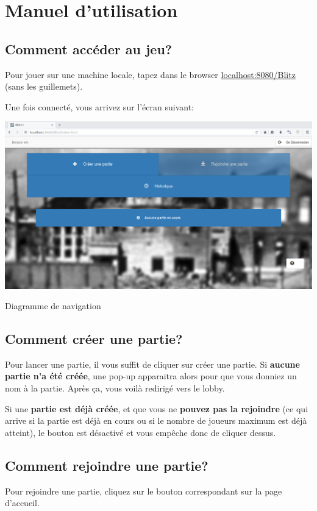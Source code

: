 \documentclass[11pt]{scrreprt}
\begin{document}
    \section{Manuel d'utilisation}
    \subsection{Comment accéder au jeu?}
    Pour jouer sur une machine locale, tapez dans le browser \og \url{localhost:8080/Blitz}\fg{} (sans les guillemets).

    Une fois connecté, vous arrivez sur l'écran suivant:

    \begin{table}[H]
        \centering
        \includegraphics[width=\textwidth]{images/accueil.png}
        \caption{Diagramme de navigation}
    \end{table}

    \subsection{Comment créer une partie?}
    Pour lancer une partie, il vous suffit de cliquer sur créer une partie.
    Si \textbf{aucune partie n'a été créée}, une pop-up apparaitra alors pour que vous donniez un nom à la partie. Après ça, vous voilà redirigé vers le lobby.

    Si une \textbf{partie est déjà créée}, et que vous ne \textbf{pouvez pas la rejoindre} (ce qui arrive si la partie est déjà en cours ou si le nombre de joueurs maximum est déjà atteint), le bouton est désactivé et vous empêche donc de cliquer dessus.

    \subsection{Comment rejoindre une partie?}
    Pour rejoindre une partie, cliquez sur le bouton correspondant sur la page d'accueil.
\end{document}
